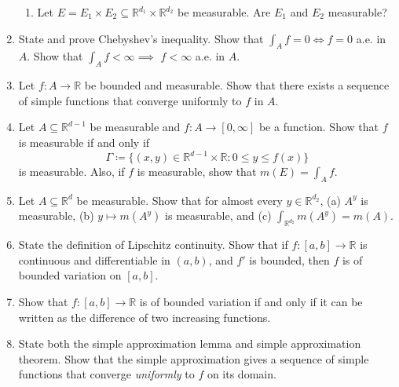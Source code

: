 \begin{enumerate}
\begin{enumerate}
			\item Let \( E = E_1 \times E_2 \subseteq \mathbb{R}^{d_1} \times \mathbb{R}^{d_2}   \) be measurable. Are \( E_1 \) and \( E_2 \) measurable?
		\end{enumerate}
	\item State and prove Chebyshev's inequality. Show that \( \int_{A} f = 0 \iff f= 0  \) a.e. in \( A \). Show that \( \int_{A} f < \infty\implies  \) \( f < \infty \) a.e. in \( A \).
	\item Let \( f : A \to \mathbb{R} \) be bounded and measurable. Show that there exists a sequence of simple functions that converge uniformly to \( f \) in \( A \).
	\item Let \( A \subseteq \mathbb{R}^{d - 1}  \) be measurable and \( f : A \to [0, \infty ]\) be a function. Show that \( f \) is measurable if and only if \[\Gamma \coloneqq \{ (x,y) \in \mathbb{R}^{d- 1} \times \mathbb{R} : 0 \leq y \leq f(x) \} \] is measurable. Also, if \( f \) is measurable, show that \( m(E) = \int_{A} f \).
	\item Let \( A \subseteq \mathbb{R}^{d}  \) be measurable. Show that for almost every \( y \in \mathbb{R}^{d_2}  \), (a) \( A^{y}  \) is measurable, (b) \( y \mapsto m(A^{y})  \) is measurable, and (c) \( \int_{\mathbb{R}^{d_2} }  m(A^{y} ) = m(A)\).
	\item State the definition of Lipschitz continuity. Show that if \( f : [a,b] \to \mathbb{R} \) is continuous and differentiable in \( (a,b) \), and \( f' \) is bounded, then \( f \) is of bounded variation on \( [a,b] \).
	\item Show that \( f : [a,b] \to \mathbb{R} \) is of bounded variation if and only if it can be written as the difference of two increasing functions.
	\item State both the simple approximation lemma and simple approximation theorem. Show that the simple approximation gives a sequence of simple functions that converge \emph{uniformly} to \( f \) on its domain.
	
	
	
	
	
\end{enumerate}


